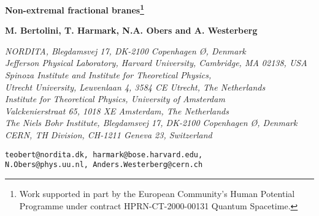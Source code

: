 \documentclass[a4paper,11pt]{article}
\begin{document}
\renewcommand{\thefootnote}{\fnsymbol{footnote}}
\setcounter{footnote}{1}

\begin{titlepage}

\vspace*{-10ex}


\vspace{7ex}

\begin{center}

{\LARGE \bf Non-extremal fractional branes\footnote{Work supported in
part by the European Community's Human Potential Programme under
contract  HPRN-CT-2000-00131 Quantum Spacetime.}}

\vspace{8ex}

{\large \bf M. Bertolini\coordHE{}, T. Harmark\coordHE{},
N.A. Obers\coordHE{}  and A. Westerberg\coordHE{}}

\vspace{4ex}

{\it {}\coordHE{}NORDITA, Blegdamsvej 17, DK-2100 Copenhagen \O,
Denmark\\[.75ex] \coordHE{}Jefferson Physical Laboratory, Harvard
University, Cambridge, MA 02138, USA \\[.75ex] \coordHE{}Spinoza Institute
and Institute for Theoretical Physics,\\[-.3ex] Utrecht University,
Leuvenlaan 4, 3584 CE Utrecht, The Netherlands \\[.75ex]
\coordHE{}Institute for Theoretical Physics, University of Amsterdam
\\[-.3ex] Valckenierstraat 65, 1018 XE Amsterdam, The Netherlands
\\[.75ex] \coordHE{}The Niels Bohr Institute, Blegdamsvej 17, DK-2100 
Copenhagen \O, Denmark
\\[.75ex] \coordHE{}CERN, TH Division, CH-1211 Geneva 23, Switzerland}

\vspace*{3ex}

{\small\tt teobert@nordita.dk, harmark@bose.harvard.edu,\\[-.75ex]
N.Obers@phys.uu.nl, Anders.Westerberg@cern.ch}


\end{center}
\end{titlepage}
\end{document}
